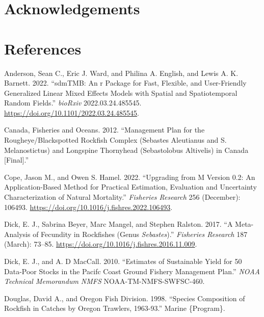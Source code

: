 \documentclass[
]{scrartcl}
\newlength{\cslhangindent}
\newenvironment{CSLReferences}[2] %
 {\begin{list}{}{%
  \setlength{\itemindent}{0pt}
  \setlength{\leftmargin}{0pt}
  \setlength{\parsep}{0pt}
  \ifodd #1
   \setlength{\leftmargin}{\cslhangindent}
   \setlength{\itemindent}{-1\cslhangindent}
  \fi
  \setlength{\itemsep}{#2\baselineskip}}}
 {\end{list}}
\begin{document}
\newpage{}

\section{Acknowledgements}\label{sec-acknowledgements}

\newpage{}

\section{References}\label{references}

\label{refs}
\begin{CSLReferences}{1}{0}
Anderson, Sean C., Eric J. Ward, and Philina A. English, and Lewis A. K.
Barnett. 2022. {``{sdmTMB}: An r Package for Fast, Flexible, and
User-Friendly Generalized Linear Mixed Effects Models with Spatial and
Spatiotemporal Random Fields.''} \emph{bioRxiv} 2022.03.24.485545.
\url{https://doi.org/10.1101/2022.03.24.485545}.

Canada, Fisheries and Oceans. 2012. {``Management {Plan} for the
{Rougheye}/{Blackspotted} {Rockfish} {Complex} ({Sebastes} Aleutianus
and {S}. Melanostictus) and {Longspine} {Thornyhead} ({Sebastolobus}
Altivelis) in {Canada} {[}{Final}{]}.''}

Cope, Jason M., and Owen S. Hamel. 2022. {``Upgrading from {M} Version
0.2: {An} Application-Based Method for Practical Estimation, Evaluation
and Uncertainty Characterization of Natural Mortality.''}
\emph{Fisheries Research} 256 (December): 106493.
\url{https://doi.org/10.1016/j.fishres.2022.106493}.

Dick, E. J., Sabrina Beyer, Marc Mangel, and Stephen Ralston. 2017. {``A
Meta-Analysis of Fecundity in Rockfishes (Genus \emph{Sebastes}).''}
\emph{Fisheries Research} 187 (March): 73--85.
\url{https://doi.org/10.1016/j.fishres.2016.11.009}.

Dick, E. J., and A. D MacCall. 2010. {``Estimates of Sustainable Yield
for 50 Data-Poor Stocks in the {Pacifc} Coast Ground {Fishery}
{Management} {Plan}.''} \emph{NOAA Technical Memorandum NMFS}
NOAA-TM-NMFS-SWFSC-460.

Douglas, David A., and Oregon Fish Division. 1998. {``Species
Composition of Rockfish in Catches by {Oregon} Trawlers, 1963-93.''}
Marine \{Program\}.


\end{CSLReferences}
\end{document}
